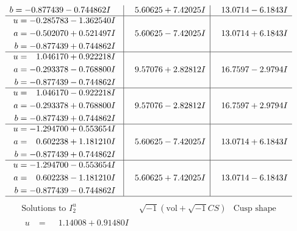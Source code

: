 \documentclass[1p]{elsarticle_modified}
\theoremstyle{definition}
\newcommand{\I}{\sqrt{-1}}
\begin{document}
$$\begin{array}{c|c|c}
\begin{aligned}
b &= -0.877439 - 0.744862 I\end{aligned}
 & \phantom{-}5.60625 + 7.42025 I & \phantom{-}13.0714 - 6.1843 I \\ \hline\begin{aligned}
u &= -0.285783 - 1.362540 I \\
a &= -0.502070 + 0.521497 I \\
b &= -0.877439 + 0.744862 I\end{aligned}
 & \phantom{-}5.60625 - 7.42025 I & \phantom{-}13.0714 + 6.1843 I \\ \hline\begin{aligned}
u &= \phantom{-}1.046170 + 0.922218 I \\
a &= -0.293378 - 0.768800 I \\
b &= -0.877439 - 0.744862 I\end{aligned}
 & \phantom{-}9.57076 + 2.82812 I & \phantom{-}16.7597 - 2.9794 I \\ \hline\begin{aligned}
u &= \phantom{-}1.046170 - 0.922218 I \\
a &= -0.293378 + 0.768800 I \\
b &= -0.877439 + 0.744862 I\end{aligned}
 & \phantom{-}9.57076 - 2.82812 I & \phantom{-}16.7597 + 2.9794 I \\ \hline\begin{aligned}
u &= -1.294700 + 0.553654 I \\
a &= \phantom{-}0.602238 + 1.181210 I \\
b &= -0.877439 + 0.744862 I\end{aligned}
 & \phantom{-}5.60625 - 7.42025 I & \phantom{-}13.0714 + 6.1843 I \\ \hline\begin{aligned}
u &= -1.294700 - 0.553654 I \\
a &= \phantom{-}0.602238 - 1.181210 I \\
b &= -0.877439 - 0.744862 I\end{aligned}
 & \phantom{-}5.60625 + 7.42025 I & \phantom{-}13.0714 - 6.1843 I\\
 \hline 
 \end{array}$$\newpage$$\begin{array}{c|c|c}  
\text{Solutions to }I^u_{2}& \I (\text{vol} + \sqrt{-1}CS) & \text{Cusp shape}\\
 \hline 
\begin{aligned}
u &= \phantom{-}1.14008 + 0.91480 I \\

\end{aligned}
\end{array}$$
\end{document}
